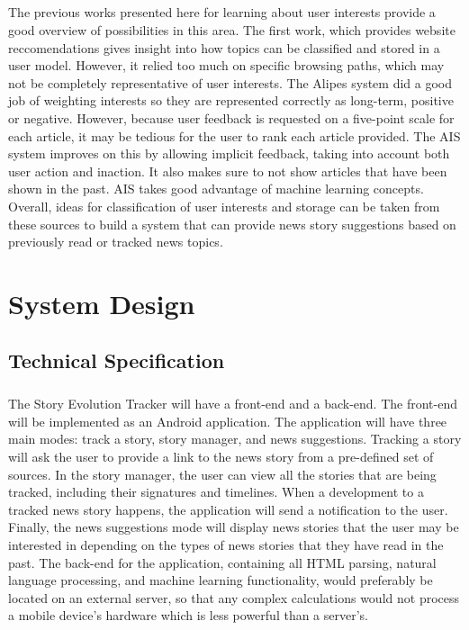 \documentclass[11pt,titlepage]{report}
\begin{document}
\paragraph{}
The previous works presented here for learning about user interests provide a good overview of possibilities in this area. The first work, which provides website reccomendations gives insight into how topics can be classified and stored in a user model. However, it relied too much on specific browsing paths, which may not be completely representative of user interests. The Alipes system did a good job of weighting interests so they are represented correctly as long-term, positive or negative. However, because user feedback is requested on a five-point scale for each article, it may be tedious for the user to rank each article provided. The AIS system improves on this by allowing implicit feedback, taking into account both user action and inaction.  It also makes sure to not show articles that have been shown in the past. AIS takes good advantage of machine learning concepts. Overall, ideas for classification of user interests and storage can be taken from these sources to build a system that can provide news story suggestions based on previously read or tracked news topics.
\chapter{System Design}
\section{Technical Specification}
\paragraph{}
The Story Evolution Tracker will have a front-end and a back-end. The front-end will be implemented as an Android application. The application will have three main modes: track a story, story manager, and news suggestions. Tracking a story will ask the user to provide a link to the news story from a pre-defined set of sources. In the story manager, the user can view all the stories that are being tracked, including their signatures and timelines. When a development to a tracked news story happens, the application will send a notification to the user. Finally, the news suggestions mode will display news stories that the user may be interested in depending on the types of news stories that they have read in the past. The back-end for the application, containing all HTML parsing, natural language processing, and machine learning functionality, would preferably be located on an external server, so that any complex calculations would not process a mobile device's hardware which is less powerful than a server's.
\end{document}
